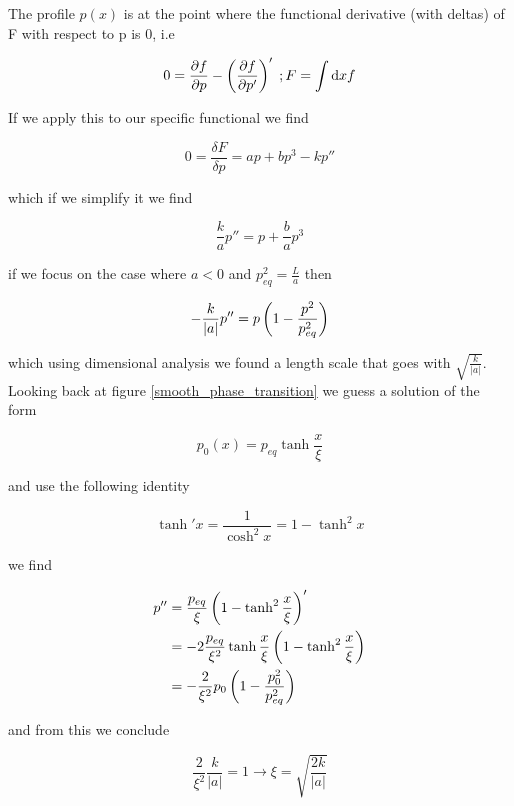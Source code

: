 The profile $p(x)$ is at the point where the functional derivative  (with deltas) of F with respect to p is 0, i.e

\begin{equation}
	0=\diffp{f}{p}-\ins{\diffp{f}{p'}}' \; ; F=\int\dd xf
\end{equation}

If we apply this to our specific functional we find

\begin{equation}
	0 = \frac{\delta F}{\delta p} = ap+bp^3-kp''
\end{equation}

which if we simplify it we find

\begin{equation}
	\frac{k}{a}p''=p+\frac{b}{a}p^3
\end{equation}

if we focus on the case where $a<0$ and $p_{eq}^2=\frac{L}{a}$ then

\begin{equation}
	-\frac{k}{\lvert a \rvert}p'' = p\left(1-\frac{p^2}{p_{eq}^2}\right)
\end{equation}

which using dimensional analysis we found a length scale that goes with $\sqrt{\frac{k}{\lvert a \rvert}}$. Looking back at figure \ref{smooth_phase_transition} we guess a solution of the form

\begin{equation}
	p_0(x) = p_{eq}\tanh\frac{x}{\xi}
\end{equation}

and use the following identity

\begin{equation}
	\tanh'x=\frac{1}{\cosh^2x}=1-\tanh^2x
\end{equation}

we find

\begin{align}
	p'' &= \frac{p_{eq}}{\xi}\left(1-\tanh^2\frac{x}{\xi}\right)'\\
	&= -2\frac{p_{eq}}{\xi^2}\tanh\frac{x}{\xi}\left(1-\tanh^2\frac{x}{\xi}\right)\\
	&= -\frac{2}{\xi^2}p_0\left(1-\frac{p_0^2}{p_{eq}^2}\right)
\end{align}

and from this we conclude

\begin{equation}
	\frac{2}{\xi^2}\frac{k}{\lvert a \rvert}=1 \rightarrow \xi = \sqrt{\frac{2k}{\lvert a \rvert}}
\end{equation}

